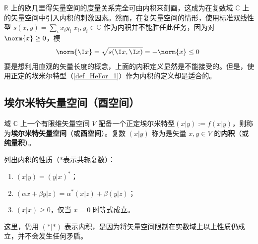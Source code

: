 
\begin{issues}
\issueTODO
\end{issues}

$\mathbb{R}$ 上的欧几里得矢量空间的度量关系完全可由内积来刻画，这成为在复数域 $\mathbb{C}$ 上的矢量空间中引入内积的刺激因素。然而，在复矢量空间的情形，使用标准双线性型 $s( x, y)=\sum_{i}x_iy_i\;x_i,y_i\in\mathbb{C}$ 作为内积并不能胜任此任务，因为对 $\norm{x}\geq0$，模
\begin{equation}
\norm{\I x}=\sqrt{s(\I x,\I x)}=-\norm{ x}\leq0~
\end{equation}
要是想利用直观的矢量长度的概念，上面的内积定义显然是不能接受的。但是，使用正定的埃米尔特型（\autoref{def_HeFor_1}）作为内积的定义却是适合的。
\subsection{埃尔米特矢量空间（酉空间）}
\begin{definition}{}\label{def_HVorUV_1}
域 $\mathbb{C}$ 上一个有限维矢量空间 $V$ 配备一个正定埃尔米特型$( x|  y):=f(  x|  y)$，则称为\textbf{埃尔米特矢量空间}（或\textbf{酉空间}）。复数 $(  x|  y)$ 称为是矢量 $  x,  y\in V$ 的\textbf{内积}（或\textbf{纯量积}）。
\end{definition}
列出内积的性质（*表示共轭复数）：
\begin{enumerate}
\item $(  x|  y)=(  y|  x)^*$；
\item $(\alpha  x+\beta  y|  z)=\alpha^*(  x|  z)+\beta(  y|  z)$；
\item $(  x|  x)\geq0$，仅当 $  x=  0$ 时等式成立。
\end{enumerate}

这里，仍用 $(*|*)$ 表示内积，是因为将矢量空间限制在实数域上以上性质仍成立，并不会发生任何矛盾。

